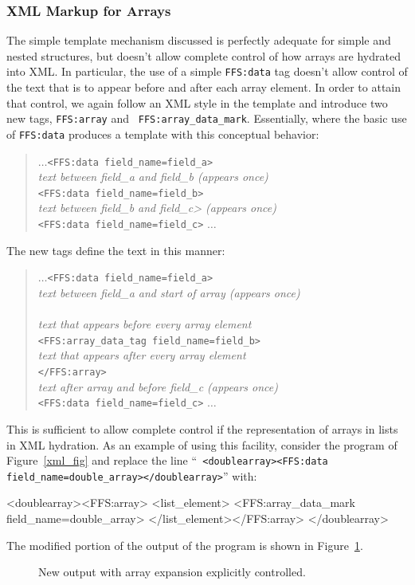 \subsubsection{XML Markup for Arrays}
The simple template mechanism discussed is perfectly adequate for simple
and nested structures, but doesn't allow complete control of how arrays are
hydrated into XML.  In particular, the use of a simple {\tt FFS:data} tag
doesn't allow control of the text that is to appear before and after each
array element.  In order to attain that control, we again follow an XML
style in the template and introduce two new tags, {\tt FFS:array} and {\tt
FFS:array\_data\_mark}.  Essentially, where the basic use of {\tt FFS:data}
produces a template with this conceptual behavior:
\begin{quote}
\small
$\dots${\tt <FFS:data field\_name=field\_a>}\\
{\it text between field\_a and field\_b (appears once)}\\
{\tt <FFS:data field\_name=field\_b>}\\
{\it text between field\_b and field\_c> (appears once)}\\
{\tt <FFS:data field\_name=field\_c>}
$\dots$
\end{quote}
The new tags define the text in this manner:
\begin{quote}
\small
$\dots${\tt <FFS:data field\_name=field\_a>}\\
{\it text between field\_a and start of array (appears once)}\\
{\tt <FFS:array>}\\
{\it text that appears before every array element}\\
{\tt <FFS:array\_data\_tag field\_name=field\_b>}\\
{\it text that appears after every array element}\\
{\tt </FFS:array>}\\
{\it text after array and before field\_c (appears once)}\\
{\tt <FFS:data field\_name=field\_c>}
$\dots$
\end{quote}
This is sufficient to allow complete control if the representation of arrays in
lists in XML hydration.  As an example of using this facility, consider the
program of Figure~\ref{xml_fig} and replace the line ``{\tt
<doublearray><FFS:data field\_name=double\_array></doublearray>}'' with:
\begin{Code}
	<doublearray><FFS:array>
	    <list_element>
		<FFS:array_data_mark field_name=double_array>
	    </list_element></FFS:array>
	</doublearray>
\end{Code}
The modified portion of the  output of the program is shown in Figure~\ref{xml_output2}.
\begin{figure}[t]
\caption{New output with array expansion explicitly controlled.\label{xml_output2}}
\end{figure}

